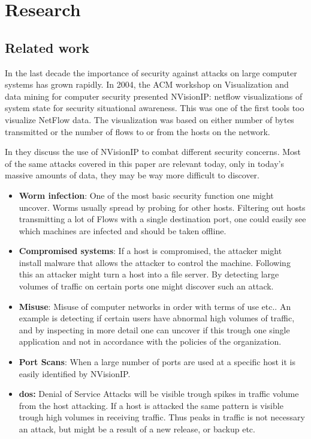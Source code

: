 \chapter{Research}
\label{chp:research} 

\section{Related work}
In the last decade the importance of security against attacks on large computer systems has grown rapidly. In 2004, the ACM workshop on Visualization and data mining for computer security presented NVisionIP: netflow visualizations of system state for security situational awareness\cite{nvisionip}. This was one of the first tools too visualize NetFlow data. The visualization was based on either number of bytes transmitted or the number of flows to or from the hosts on the network. 

In \cite{nvisionip_list} they discuss the use of NVisionIP to combat different security concerns. Most of the same attacks covered in this paper are relevant today, only in today's massive amounts of data, they may be way more difficult to discover. 

\begin{itemize}
\item \textbf{Worm infection}: One of the most basic security function one might uncover.  Worms usually spread by probing for other hosts. Filtering out hosts transmitting a lot of Flows with a single destination port, one could easily see which machines are infected and should be taken offline. 
\item \textbf{Compromised systems}: If a host is compromised, the attacker might install malware that allows the attacker to control the machine. Following this an attacker might turn a host into a file server. By detecting large volumes of traffic on certain ports one might discover such an attack. 
\item \textbf{Misuse}: Misuse of computer networks in order with terms of use etc.. An example is detecting if certain users have abnormal high volumes of traffic, and by inspecting in more detail one can uncover if this trough one single application and not in accordance with the policies of the organization. 
\item \textbf{Port Scans}: When a large number of ports are used at a specific host it is easily identified by NVisionIP.
\item \label{patterns}\textbf{\gls{dos}:} Denial of Service Attacks will be visible trough spikes in traffic volume from the host attacking. If a host is attacked the same pattern is visible trough high volumes in receiving traffic. Thus peaks in traffic is not necessary an attack, but might be a result of a new release, or backup etc.
\end{itemize}




